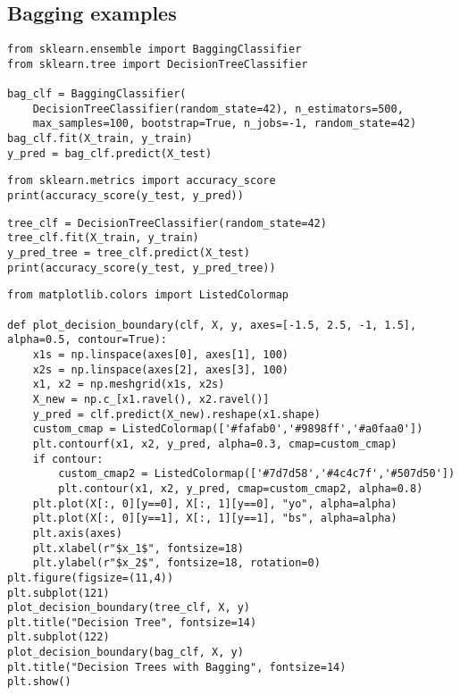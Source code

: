 \documentclass[%
oneside,                 %
final,                   %
10pt]{article}
\begin{document}
\subsection*{Bagging examples}

\begin{verbatim}
from sklearn.ensemble import BaggingClassifier
from sklearn.tree import DecisionTreeClassifier

bag_clf = BaggingClassifier(
    DecisionTreeClassifier(random_state=42), n_estimators=500,
    max_samples=100, bootstrap=True, n_jobs=-1, random_state=42)
bag_clf.fit(X_train, y_train)
y_pred = bag_clf.predict(X_test)
\end{verbatim}


\begin{verbatim}
from sklearn.metrics import accuracy_score
print(accuracy_score(y_test, y_pred))
\end{verbatim}

\begin{verbatim}
tree_clf = DecisionTreeClassifier(random_state=42)
tree_clf.fit(X_train, y_train)
y_pred_tree = tree_clf.predict(X_test)
print(accuracy_score(y_test, y_pred_tree))
\end{verbatim}

\begin{verbatim}
from matplotlib.colors import ListedColormap

def plot_decision_boundary(clf, X, y, axes=[-1.5, 2.5, -1, 1.5], alpha=0.5, contour=True):
    x1s = np.linspace(axes[0], axes[1], 100)
    x2s = np.linspace(axes[2], axes[3], 100)
    x1, x2 = np.meshgrid(x1s, x2s)
    X_new = np.c_[x1.ravel(), x2.ravel()]
    y_pred = clf.predict(X_new).reshape(x1.shape)
    custom_cmap = ListedColormap(['#fafab0','#9898ff','#a0faa0'])
    plt.contourf(x1, x2, y_pred, alpha=0.3, cmap=custom_cmap)
    if contour:
        custom_cmap2 = ListedColormap(['#7d7d58','#4c4c7f','#507d50'])
        plt.contour(x1, x2, y_pred, cmap=custom_cmap2, alpha=0.8)
    plt.plot(X[:, 0][y==0], X[:, 1][y==0], "yo", alpha=alpha)
    plt.plot(X[:, 0][y==1], X[:, 1][y==1], "bs", alpha=alpha)
    plt.axis(axes)
    plt.xlabel(r"$x_1$", fontsize=18)
    plt.ylabel(r"$x_2$", fontsize=18, rotation=0)
plt.figure(figsize=(11,4))
plt.subplot(121)
plot_decision_boundary(tree_clf, X, y)
plt.title("Decision Tree", fontsize=14)
plt.subplot(122)
plot_decision_boundary(bag_clf, X, y)
plt.title("Decision Trees with Bagging", fontsize=14)
plt.show()
\end{verbatim}
\end{document}
